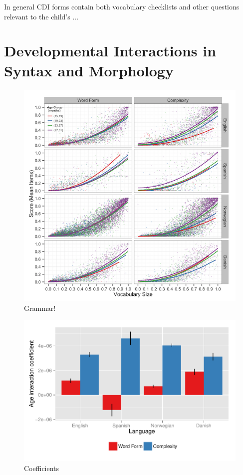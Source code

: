 \documentclass[10pt,letterpaper]{article}
\begin{document}
In general CDI forms contain both vocabulary checklists and other questions relevant to the child's ...

\section{Developmental Interactions in Syntax and Morphology}



\begin{figure}[t]
\begin{center}
\includegraphics[scale=0.8]{plots/grammar.png}
\end{center}
\caption{Grammar!} 
\label{grammar}
\end{figure}

\begin{figure}[t]
\begin{center}
\includegraphics[width=\linewidth]{plots/coeffs}
\end{center}
\caption{Coefficients} 
\label{coeffs}
\end{figure}
\end{document}
